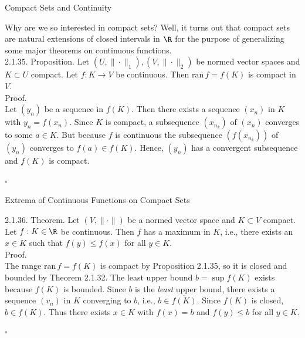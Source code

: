 \documentclass[smaller,hyperref={CJKbookmarks=true}]{beamer}
\begin{document}
\begin{frame}[c]{Compact Sets and Continuity}
\begin{spacing}{1.1}
Why are we so interested in compact sets? Well, it turns out that compact
sets are natural extensions of closed intervals in $\R$ for the purpose of
generalizing some major theorems on continuous functions.\\[6pt]
\alert{2.1.35. Proposition.} Let $(U,\|\cdot\|_1),(V,\|\cdot\|_2)$ be normed vector spaces and $K\subset U$ compact. Let $f:K\to V$ be continuous. Then $\text{ran}\,f=f(K)$ is compact in $V$.\\[6pt]
\alert{Proof.}\\
Let $(y_n)$ be a sequence in $f(K)$. Then there exists a sequence $(x_n)$ in $K$ with $y_n=f(x_n)$. Since $K$ is compact, a subsequence $(x_{n_k})$ of $(x_n)$ converges to some $a\in K$. But because $f$ is continuous the subsequence $(f(x_{n_k}))$ of $(y_n)$ converges to $f(a)\in f(K)$. Hence, $(y_n)$ has a convergent subsequence and $f(K)$ is compact.
\begin{flushright}
  $\square$
\end{flushright}
\end{spacing}
\end{frame}
\begin{frame}[c]{Extrema of Continuous Functions on Compact Sets}
\begin{spacing}{1.1}
\alert{2.1.36. Theorem.} Let $(V,\|\cdot\|)$ be a normed vector space and $K\subset V$ compact. Let $f:K\in\R$ be continuous. Then $f$ has a maximum in $K$, i.e., there exists an $x\in K$ such that $f(y)\leq f(x)$ for all $y\in K$.\\[6pt]
\alert{Proof.}\\
The range $\text{ran}\,f=f(K)$ is compact by Proposition 2.1.35, so it is closed and bounded
by Theorem 2.1.32. The least upper bound $b=\sup f(K)$ exists because $f(K)$ is bounded. Since $b$ is the \emph{least} upper bound, there exists a sequence $(v_n)$ in $K$ converging to $b$, i.e., $b\in\overline{f(K)}$. Since $f(K)$ is closed, $b\in f(K)$. Thus there exists $x\in K$ with $f(x)=b$ and $f(y)\leq b$ for all $y\in K$.
\begin{flushright}
  $\square$
\end{flushright}
\end{spacing}
\end{frame}
\end{document}
